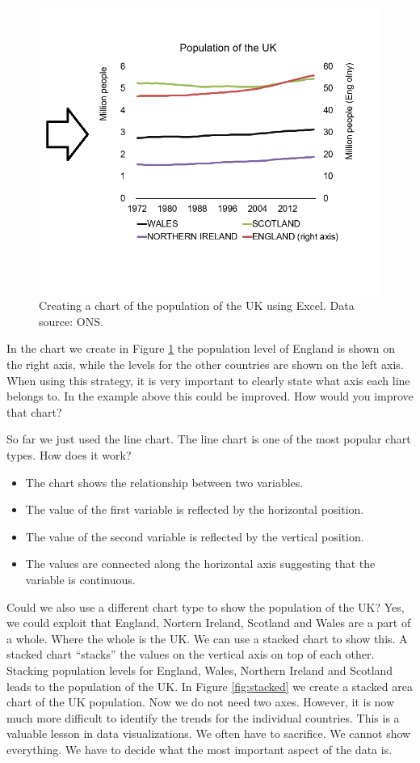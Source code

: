 \documentclass[]{book}
\providecommand{\tightlist}{%
  \setlength{\itemsep}{0pt}\setlength{\parskip}{0pt}}
\begin{document}
\begin{figure}

{\centering \includegraphics[width=0.5\linewidth]{_resources/chapter_people/nice1} 

}

\caption{Creating a chart of the population of the UK  using Excel. Data source: ONS.}\label{fig:nicelookingc}
\end{figure}

In the chart we create in Figure \ref{fig:nicelookingc} the population level of England is shown on the right axis, while the levels for the other countries are shown on the left axis. When using this strategy, it is very important to clearly state what axis each line belongs to. In the example above this could be improved. How would you improve that chart?

So far we just used the line chart. The line chart is one of the most popular chart types. How does it work?

\begin{itemize}
\tightlist
\item
  The chart shows the relationship between two variables.
\item
  The value of the first variable is reflected by the horizontal position.
\item
  The value of the second variable is reflected by the vertical position.
\item
  The values are connected along the horizontal axis suggesting that the variable is continuous.
\end{itemize}

Could we also use a different chart type to show the population of the UK? Yes, we could exploit that England, Nortern Ireland, Scotland and Wales are a part of a whole. Where the whole is the UK. We can use a stacked chart to show this. A stacked chart ``stacks'' the values on the vertical axis on top of each other. Stacking population levels for England, Wales, Northern Ireland and Scotland leads to the population of the UK. In Figure \ref{fig:stacked} we create a stacked area chart of the UK population. Now we do not need two axes. However, it is now much more difficult to identify the trends for the individual countries. This is a valuable lesson in data visualizations. We often have to sacrifice. We cannot show everything. We have to decide what the most important aspect of the data is.
\end{document}
